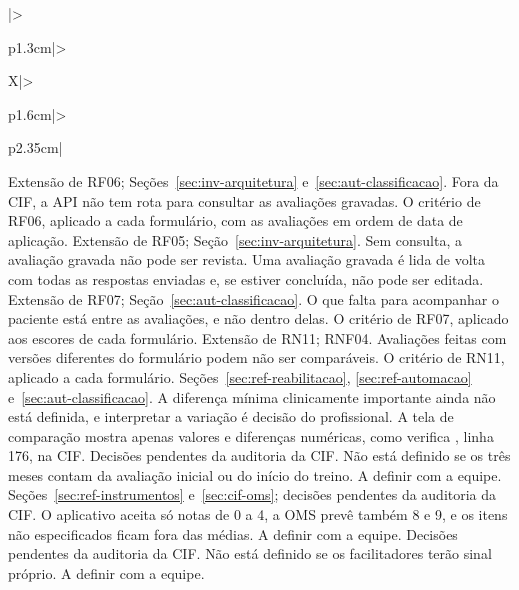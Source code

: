 \begin{apendicesenv}
{\begin{xltabular}{\textwidth}{|>{\raggedright\arraybackslash}p{1.3cm}|>{\raggedright\arraybackslash}X|>{\raggedright\arraybackslash}p{1.6cm}|>{\raggedright\arraybackslash}p{2.35cm}|}
		{Extensão de RF06; Seções~\ref{sec:inv-arquitetura} e~\ref{sec:aut-classificacao}.}
		{Fora da CIF, a API não tem rota para consultar as avaliações gravadas.}
		{O critério de RF06, aplicado a cada formulário, com as avaliações em ordem de data de aplicação.}
		{Extensão de RF05; Seção~\ref{sec:inv-arquitetura}.}
		{Sem consulta, a avaliação gravada não pode ser revista.}
		{Uma avaliação gravada é lida de volta com todas as respostas enviadas e, se estiver concluída, não pode ser
		editada.}
		{Extensão de RF07; Seção~\ref{sec:aut-classificacao}.}
		{O que falta para acompanhar o paciente está entre as avaliações, e não dentro delas.}
		{O critério de RF07, aplicado aos escores de cada formulário.}
		{Extensão de RN11; RNF04.}
		{Avaliações feitas com versões diferentes do formulário podem não ser comparáveis.}
		{O critério de RN11, aplicado a cada formulário.}
		{Seções~\ref{sec:ref-reabilitacao}, \ref{sec:ref-automacao} e~\ref{sec:aut-classificacao}.}
		{A diferença mínima clinicamente importante ainda não está definida, e interpretar a variação é decisão do
		profissional.}
		{A tela de comparação mostra apenas valores e diferenças numéricas, como verifica
		, linha 176, na CIF.}
		{Decisões pendentes da auditoria da CIF.}
		{Não está definido se os três meses contam da avaliação inicial ou do início do treino.}
		{A definir com a equipe.}
		{Seções~\ref{sec:ref-instrumentos} e~\ref{sec:cif-oms}; decisões pendentes da auditoria da CIF.}
		{O aplicativo aceita só notas de 0 a 4, a OMS prevê também 8 e 9, e os itens não especificados ficam fora
		das médias.}
		{A definir com a equipe.}
		{Decisões pendentes da auditoria da CIF.}
		{Não está definido se os facilitadores terão sinal próprio.}
		{A definir com a equipe.}


\end{xltabular}}
\end{apendicesenv}
